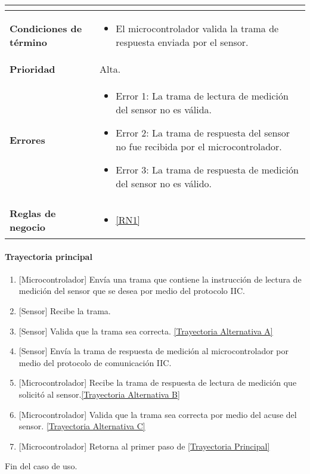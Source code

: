 \begin{longtable}{|J{5cm}|J{10.3cm}|}
\begin{itemize}
		\end{itemize} \\ \hline
	\textbf{Condiciones de término} & 
		\begin{itemize}
		    \item El microcontrolador valida la trama de respuesta enviada por el sensor.
		\end{itemize} 
		\\ \hline 
	\textbf{Prioridad} & 
		Alta. \\ \hline
	\textbf{Errores} &
		 \begin{itemize}
		 	\item \label{SUB-M-CU1.3:Error1} Error 1: La trama de lectura de medición del sensor no es válida.
		 	\item \label{SUB-M-CU1.3:Error2} Error 2: La trama de respuesta del sensor no fue recibida por el microcontrolador.
		 	\item \label{SUB-M-CU1.3:Error3} Error 3: La trama de respuesta de medición del sensor no es válido.
		 \end{itemize} \\ \hline
	\textbf{Reglas de negocio} & 
	    \begin{itemize}
	      \item  \ref{RN1}
		 \end{itemize}\\ \hline
\end{longtable}

\paragraph{Trayectoria principal}
\label{SUB-M-CU1.3:TP}
	\begin{enumerate}
	    \item {[Microcontrolador]} Envía una trama que contiene la instrucción de lectura de medición del sensor que se desea por medio del protocolo IIC.
	    \item {[Sensor]} Recibe la trama.
	    \item {[Sensor]} Valida que la trama sea correcta. \hyperref[SUB-M-CU1.3:TA]{[Trayectoria Alternativa A]} %
		\item {[Sensor]} Envía la trama de respuesta de medición al microcontrolador por medio del protocolo de comunicación IIC.
		\item {[Microcontrolador]} Recibe la trama de respuesta de lectura de medición que solicitó al sensor.\hyperref[SUB-M-CU1.3:TB]{[Trayectoria Alternativa B]} %
		\item {[Microcontrolador]} Valida que la trama sea correcta por medio del acuse del sensor. \hyperref[SUB-M-CU1.3:TC]{[Trayectoria Alternativa C]}%
		\item {[Microcontrolador]} Retorna al primer paso de \hyperref[SUB-M-CU1.3:TP]{[Trayectoria Principal]}
	\end{enumerate}
	Fin del caso de uso.

